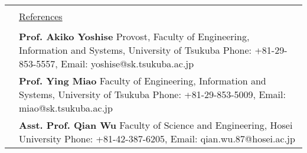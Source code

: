 \documentclass[a4paper,10pt]{article}
\newcommand{\headingfont}{\LARGE \MakeUppercase }
\newenvironment{SectionTable}[1]{
	\renewcommand*{\arraystretch}{1.0}
	\setlength{\tabcolsep}{10pt}
	\begin{longtable}{Rp{5.2in}} 
		\rule{2.3cm}{4pt} 
		& \underline{#1} \\ %
	}
	{
	\end{longtable}\vspace{-.3cm}
}
\begin{document}
\begin{SectionTable}{\headingfont References}
	&
	\textbf{Prof. Akiko Yoshise} \newline
	Provost, Faculty of Engineering, Information and Systems, University of Tsukuba \newline 
	Phone: +81-29-853-5557, Email: yoshise@sk.tsukuba.ac.jp \\
	
	
	& 
	\textbf{Prof. Ying Miao} \newline
	Faculty of Engineering, Information and Systems, University of Tsukuba \newline 
	Phone: +81-29-853-5009, Email: miao@sk.tsukuba.ac.jp\\
	
	& 
	\textbf{Asst. Prof. Qian Wu} \newline
	Faculty of Science and Engineering, Hosei University \newline 
	Phone: +81-42-387-6205, Email: qian.wu.87@hosei.ac.jp \\
\end{SectionTable}
	

\label{LastPage}  %
\end{document}
